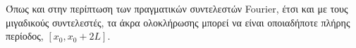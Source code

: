 \documentclass[a4paper,table]{report}
\begin{document}
      \begin{rem}
        Όπως και στην περίπτωση των πραγματικών συντελεστών Fourier, έτσι και με τους 
        μιγαδικούς συντελεστές, τα άκρα ολοκλήρωσης μπορεί να είναι οποιαδήποτε πλήρης
        περίοδος, $ [x_{0}, x_{0}+ 2L] $.
      \end{rem}


      
\end{document}
